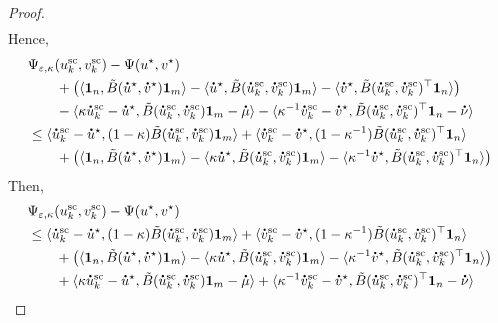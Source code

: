 \begin{proof}
\begin{align*}
\end{align*}
Hence,
\begin{align*}
&\Psi_{\varepsilon, \kappa} (u^{\text{sc}}_k ,v^{\text{sc}}_k) -\Psi(u^\star, v^\star)\\
&\qquad + \big( \inr{\mathbf 1_n, \tilde{B}(\dt{u}^{\star} ,\dt{v}^{\star})\mathbf 1_m}  
- \inr{\dt{u}^{\star{}}, \tilde{B}(\dt{u}^{\text{sc}}_k ,\dt{v}^{\text{sc}}_k)\mathbf 1_m} 
- \inr{\dt{v}^\star, \tilde{B}(\dt{u}^{\text{sc}}_k ,\dt{v}^{\text{sc}}_k)^\top\mathbf 1_n} \big)\\
& \qquad -\inr{\kappa \dt{u}^{\text{sc}}_k - \dt{u}^{\star}, \tilde{B}(\dt{u}^{\text{sc}}_k ,\dt{v}^{\text{sc}}_k)\mathbf 1_m - \dt{\mu}} -\inr{\kappa^{-1}\dt{v}^{\text{sc}}_k - \dt{v}^{\star}, \tilde{B}(\dt{u}^{\text{sc}}_k ,\dt{v}^{\text{sc}}_k)^\top\mathbf 1_n - \dt{\nu}}\\
& \leq \inr{\dt{u}^{\text{sc}}_k - \dt{u}^\star, (1-\kappa) \tilde{B}(\dt{u}^{\text{sc}}_k ,\dt{v}^{\text{sc}}_k)\mathbf 1_m} 
+ \inr{\dt{v}^{\text{sc}}_k - \dt{v}^\star, (1-\kappa^{-1}) \tilde{B}(\dt{u}^{\text{sc}}_k ,\dt{v}^{\text{sc}}_k)^\top\mathbf 1_n}\\
&\qquad + \big(\inr{\mathbf 1_n, \tilde{B}(\dt{u}^{\star} ,\dt{v}^{\star})\mathbf 1_m}  
- \inr{\kappa\dt{u}^{\star{}}, \tilde{B}(\dt{u}^{\text{sc}}_k ,\dt{v}^{\text{sc}}_k)\mathbf 1_m} 
- \inr{\kappa^{-1}\dt{v}^\star, \tilde{B}(\dt{u}^{\text{sc}}_k ,\dt{v}^{\text{sc}}_k)^\top\mathbf 1_n} \big)
\end{align*}
Then,
\begin{align*}
&\Psi_{\varepsilon, \kappa} (u^{\text{sc}}_k ,v^{\text{sc}}_k) -\Psi(u^\star, v^\star)\\
&\leq \inr{\dt{u}^{\text{sc}}_k - \dt{u}^\star, (1-\kappa) \tilde{B}(\dt{u}^{\text{sc}}_k ,\dt{v}^{\text{sc}}_k)\mathbf 1_m} 
+ \inr{\dt{v}^{\text{sc}}_k - \dt{v}^\star, (1-\kappa^{-1}) \tilde{B}(\dt{u}^{\text{sc}}_k ,\dt{v}^{\text{sc}}_k)^\top\mathbf 1_n}\\
&\qquad + \big(\inr{\mathbf 1_n, \tilde{B}(\dt{u}^{\star} ,\dt{v}^{\star})\mathbf 1_m}  
- \inr{\kappa\dt{u}^{\star{}}, \tilde{B}(\dt{u}^{\text{sc}}_k ,\dt{v}^{\text{sc}}_k)\mathbf 1_m} 
- \inr{\kappa^{-1}\dt{v}^\star, \tilde{B}(\dt{u}^{\text{sc}}_k ,\dt{v}^{\text{sc}}_k)^\top\mathbf 1_n} \big)
\\
&\qquad + \inr{\kappa \dt{u}^{\text{sc}}_k - \dt{u}^{\star}, \tilde{B}(\dt{u}^{\text{sc}}_k ,\dt{v}^{\text{sc}}_k)\mathbf 1_m - \dt{\mu}} + \inr{\kappa^{-1}\dt{v}^{\text{sc}}_k - \dt{v}^{\star}, \tilde{B}(\dt{u}^{\text{sc}}_k ,\dt{v}^{\text{sc}}_k)^\top\mathbf 1_n - \dt{\nu}}\\

\end{align*}
\end{proof}
